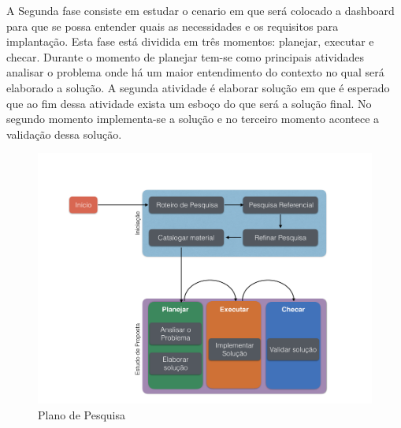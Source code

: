 A Segunda fase consiste em estudar o cenario em que será colocado a dashboard para que se possa entender quais as necessidades e os requisitos para implantação. Esta fase está dividida em três momentos: planejar,  executar e checar. Durante o momento de planejar tem-se como principais atividades analisar o problema onde há um maior entendimento do contexto no qual será elaborado a solução. A segunda atividade é elaborar solução em que é esperado que ao fim dessa atividade exista um esboço do que será a solução final. No segundo momento implementa-se a solução e no terceiro momento acontece a validação dessa solução.
\graphicspath{{figuras/}}
\begin{figure}
\centering
\includegraphics[scale=0.40]{TCCMetodologia}
\caption{Plano de Pesquisa}
\label{Rotulo}
\end{figure}

